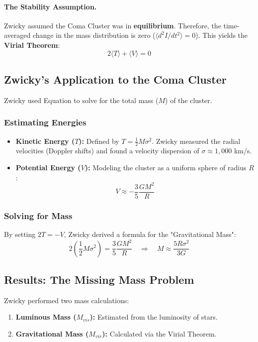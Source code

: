 \documentclass[11pt, a4paper]{article}
\begin{document}
\paragraph{The Stability Assumption.}
Zwicky assumed the Coma Cluster was in \textbf{equilibrium}. Therefore, the time-averaged change in the mass distribution is zero ($\langle d^2I/dt^2 \rangle = 0$). This yields the \textbf{Virial Theorem}:
\begin{equation} \label{eq:virial}
    2 \langle T \rangle + \langle V \rangle = 0
\end{equation}

\subsection{Zwicky's Application to the Coma Cluster}
Zwicky used Equation to solve for the total mass ($M$) of the cluster.

\subsubsection{Estimating Energies}
\begin{itemize}
    \item \textbf{Kinetic Energy ($T$):} Defined by $T = \frac{1}{2} M \sigma^2$. Zwicky measured the radial velocities (Doppler shifts) and found a velocity dispersion of $\sigma \approx 1,000$ km/s.
    \item \textbf{Potential Energy ($V$):} Modeling the cluster as a uniform sphere of radius $R$:
    \begin{equation}
        V \approx -\frac{3}{5} \frac{GM^2}{R}
    \end{equation}
\end{itemize}

\subsubsection{Solving for Mass}
By setting $2T = -V$, Zwicky derived a formula for the "Gravitational Mass":
\begin{equation}
    2 \left( \frac{1}{2} M \sigma^2 \right) = \frac{3}{5} \frac{GM^2}{R} \quad \Rightarrow \quad M \approx \frac{5 R \sigma^2}{3G}
\end{equation}

\subsection{Results: The Missing Mass Problem}
Zwicky performed two mass calculations:
\begin{enumerate}
    \item \textbf{Luminous Mass ($M_{vis}$):} Estimated from the luminosity of stars.
    \item \textbf{Gravitational Mass ($M_{vir}$):} Calculated via the Virial Theorem.
\end{enumerate}
\end{document}
